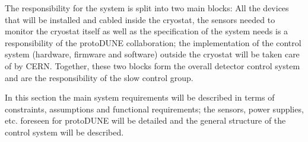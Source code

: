The responsibility for the system is split into two main blocks: All the devices that will be installed and cabled inside 
the cryostat, the sensors needed to monitor the cryostat itself as well as the specification of the system needs is a 
responsibility of the protoDUNE collaboration; the implementation of the control system (hardware, firmware and software) outside 
the cryostat will be taken care of by CERN. Together, these two blocks form the overall detector control system and are the 
responsibility of the slow control group.

In this section the main system requirements will be described in terms of constraints, assumptions and functional 
requirements; the sensors, power supplies, etc. foreseen for protoDUNE will be detailed and the general structure of 
the control system will be described.


